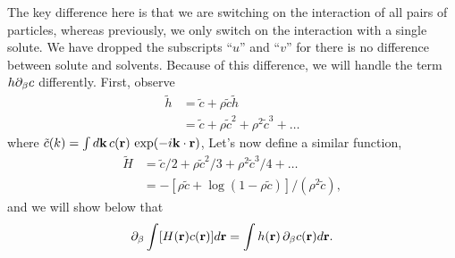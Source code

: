 \documentclass[12pt]{article}
\begin{document}
The key difference here is that we are switching on the interaction
  of all pairs of particles, whereas previously, we only switch on
  the interaction with a single solute.
%
We have dropped the subscripts ``$u$'' and ``$v$'' for there is no
  difference between solute and solvents.
%
Because of this difference, we will handle the term $h \partial_\beta c$ differently.
%
First, observe
\begin{align*}
  \tilde{h}
  &= \tilde{c} + \rho \tilde{c} \tilde{h} \\
  &= \tilde{c} + \rho \tilde{c}^2
               + \rho^2 \tilde{c}^3
               + \dots
\end{align*}
%
where $\tilde{c}(k) = \int d\mathbf{k} \, c(\mathbf{r}) \, \exp(-i \mathbf{k}\cdot\mathbf{r})$,
%
Let's now define a similar function,
%
\begin{align*}
  \tilde{H}
  &= \tilde{c}/2 + \rho \tilde{c}^2/3
               + \rho^2 \tilde{c}^3/4
               + \dots \\
  &= -\left[
      \rho \tilde{c} + \log(1 - \rho \tilde{c})
      \right] / (\rho^2 \tilde{c}),
\end{align*}
%
and we will show below that
\begin{equation}
  \partial_\beta \int [H(\mathbf{r}) c(\mathbf{r})] d \mathbf{r}
  = \int h(\mathbf{r}) \, \partial_\beta c(\mathbf{r}) d \mathbf{r}.
  \label{eq:bigH}
\end{equation}
\end{document}

